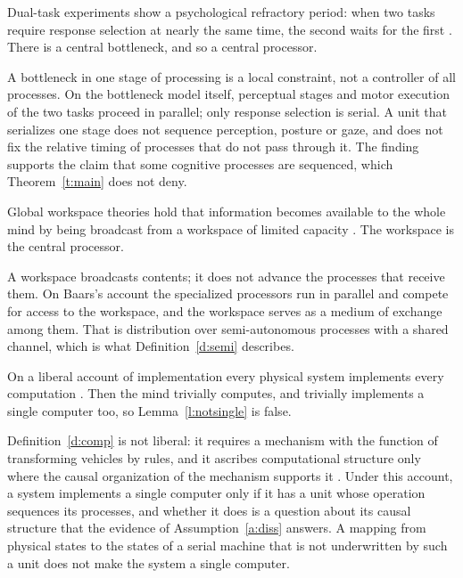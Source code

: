 \documentclass{situationist-preprint}
\begin{document}
\begin{objection}
Dual-task experiments show a psychological refractory period: when two tasks require response selection at nearly the same time, the second waits for the first \citep{Pashler1994}. There is a central bottleneck, and so a central processor.
\end{objection}

\begin{reply}
A bottleneck in one stage of processing is a local constraint, not a controller of all processes. On the bottleneck model itself, perceptual stages and motor execution of the two tasks proceed in parallel; only response selection is serial. A unit that serializes one stage does not sequence perception, posture or gaze, and does not fix the relative timing of processes that do not pass through it. The finding supports the claim that some cognitive processes are sequenced, which Theorem~\ref{t:main} does not deny.
\end{reply}

\begin{objection}
Global workspace theories hold that information becomes available to the whole mind by being broadcast from a workspace of limited capacity \citep{Baars1988}. The workspace is the central processor.
\end{objection}

\begin{reply}
A workspace broadcasts contents; it does not advance the processes that receive them. On Baars's account the specialized processors run in parallel and compete for access to the workspace, and the workspace serves as a medium of exchange among them. That is distribution over semi-autonomous processes with a shared channel, which is what Definition~\ref{d:semi} describes.
\end{reply}

\begin{objection}[Triviality]
On a liberal account of implementation every physical system implements every computation \citep{Putnam1988,Searle1992}. Then the mind trivially computes, and trivially implements a single computer too, so Lemma~\ref{l:notsingle} is false.
\end{objection}

\begin{reply}
Definition~\ref{d:comp} is not liberal: it requires a mechanism with the function of transforming vehicles by rules, and it ascribes computational structure only where the causal organization of the mechanism supports it \citep{Piccinini2015}. Under this account, a system implements a single computer only if it has a unit whose operation sequences its processes, and whether it does is a question about its causal structure that the evidence of Assumption~\ref{a:diss} answers. A mapping from physical states to the states of a serial machine that is not underwritten by such a unit does not make the system a single computer.
\end{reply}
\end{document}
